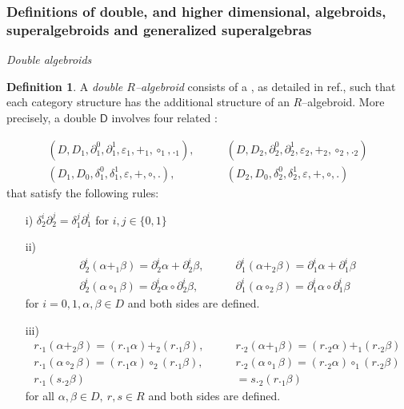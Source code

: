 \documentclass[12pt]{article}
\theoremstyle{plain}
\theoremstyle{definition}
\newtheorem{definition}{Definition}[section]
\numberwithin{equation}{section}
\newcommand{\D}{\mathcal D}
\newcommand{\vep}{\varepsilon}
\renewcommand{\a}{\alpha}
\newcommand{\be}{\beta}
\newcommand{\del}{\partial}
\newcommand{\med}{\medbreak}
\newcommand{\<}{{\langle}}
\def\D{\mathsf{D}}
\begin{document}
\subsubsection{Definitions of double, and higher dimensional, algebroids, superalgebroids and generalized superalgebras}

\emph{Double algebroids}


\begin{definition} A \emph{double $R$--algebroid} consists of a 
, 
as detailed in ref.\cite{BS1}, such that each category structure has the additional structure of
an $R$--algebroid.  More precisely, a double  $\D$ involves four related 
:

\begin{equation}
\begin{aligned} (D,D_1,\del^0_1 ,\del^1_1 , \vep_1 , +_1 , \circ _1 , ._1)
,\qquad  &(D,D_2,\del^0_2 , \del ^1_2 , \vep_2 , +_2 , \circ _2 ,
._2 )\\
 (D_1,D_0, \delta^0_1 ,\delta^1_1 , \vep , + , \circ  , .) ,\qquad
 &(D_2 , D_0 , \delta^0_2 , \delta^1_2 , \vep , + , \circ  , .)
\end{aligned}
\end{equation}
that satisfy the following rules:

\begin{itemize}
\item[i)]
$\delta^i_2 \del^j_2 = \delta ^j_1 \del ^i_1$  for $i,j \in
\{0,1\}$

\med
\item[ii)]
\begin{equation}
\begin{aligned} \del^i_2 ( \a +_1 \be) = \del^i_2\a
+\del^i_2\be , \qquad &\del^i_1 ( \a +_2 \be) = \del^i_1 \a
+\del^i_1\be \\ \del^i_2 ( \a \circ _1 \be) = \del^i_2 \a \circ
\del^i_2 \be ,\qquad  &  \del^i_1 (\a \circ _2 \be ) = \del^i_1\a
\circ \del^i_1\be
\end{aligned}
\end{equation}
for $i = 0,1 , \a,\be  \in D$ and both sides are defined.

\med
\item[iii)]
\begin{equation}
\begin{aligned}
r ._1 (\a+_2 \be) = (r ._1 \a) +_2 (r ._1\be ) ,\qquad  & r ._2
(\a  +_1 \be  ) = (r ._2 \a ) +_1 (r ._2\be  )\\ r ._1 (\a  \circ
_2 \be ) = (r ._1\a ) \circ _2  (r ._1 \be )  , \qquad & r ._2 (\a
\circ _1 \be  ) = (r ._2 \a ) \circ _1  (r ._2\be )\\
 r ._1 ( s ._2 \be  ) &= s ._2 ( r._1 \be  )
\end{aligned}
\end{equation}
for all $\a ,\be  \in  D, ~r,s \in R$ and both sides are defined.


\end{itemize}
\end{definition}
\end{document}
